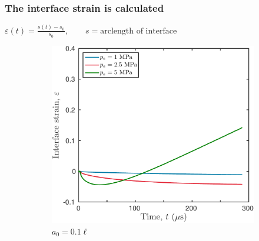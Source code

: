 \begin{frame}\frametitle{\vspace*{0.5cm}The interface strain is calculated}
  \begin{center}
    $\varepsilon(t) = \frac{s(t)-s_0}{s_0},    \qquad s = \text{arclength of interface}$
  \end{center}
  \begin{figure}
    \captionsetup[subfigure]{labelformat=empty}
    \centering
    \begin{subfigure}[b]{0.45\textwidth}
      \includegraphics[width=\textwidth]{../figs/lung_figs/rmawave_1_A10,25,50_a10_strain_15-Jun-2017_dim}
      \caption{\label{fig:strain_multi-pa_a30} $a_0 = 0.1\ell$}
    \end{subfigure}
    ~
    \begin{subfigure}[b]{0.45\textwidth}

\end{subfigure}
\end{figure}
\end{frame}
